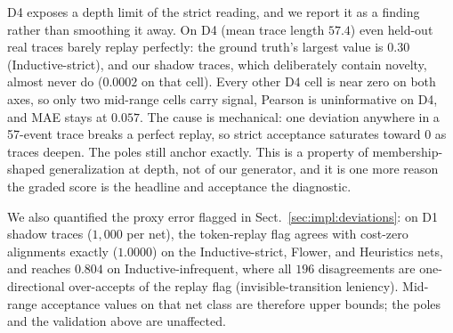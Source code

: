 \documentclass[runningheads]{llncs}
\newcommand{\chg}[1]{\textcolor{chgblue}{#1}}
\begin{document}
\chg{D4 exposes a depth limit of the strict reading, and we report it as a finding rather than smoothing it away. On D4 (mean trace length $57.4$) even held-out real traces barely replay perfectly: the ground truth's largest value is $0.30$ (Inductive-strict), and our shadow traces, which deliberately contain novelty, almost never do ($0.0002$ on that cell). Every other D4 cell is near zero on both axes, so only two mid-range cells carry signal, Pearson is uninformative on D4, and MAE stays at $0.057$. The cause is mechanical: one deviation anywhere in a 57-event trace breaks a perfect replay, so strict acceptance saturates toward $0$ as traces deepen. The poles still anchor exactly. This is a property of membership-shaped generalization at depth, not of our generator, and it is one more reason the graded score is the headline and acceptance the diagnostic.}

\chg{We also quantified the proxy error flagged in Sect.~\ref{sec:impl:deviations}: on D1 shadow traces ($1{,}000$ per net), the token-replay flag agrees with cost-zero alignments exactly ($1.0000$) on the Inductive-strict, Flower, and Heuristics nets, and reaches $0.804$ on Inductive-infrequent, where all $196$ disagreements are one-directional over-accepts of the replay flag (invisible-transition leniency). Mid-range acceptance values on that net class are therefore upper bounds; the poles and the validation above are unaffected.}
\end{document}
